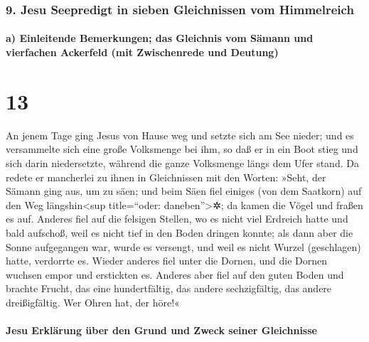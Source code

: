 \hypertarget{jesu-seepredigt-in-sieben-gleichnissen-vom-himmelreich}{%
\subsubsection{9. Jesu Seepredigt in sieben Gleichnissen vom
Himmelreich}\label{jesu-seepredigt-in-sieben-gleichnissen-vom-himmelreich}}

\hypertarget{a-einleitende-bemerkungen-das-gleichnis-vom-suxe4mann-und-vierfachen-ackerfeld-mit-zwischenrede-und-deutung}{%
\paragraph{a) Einleitende Bemerkungen; das Gleichnis vom Sämann und
vierfachen Ackerfeld (mit Zwischenrede und
Deutung)}\label{a-einleitende-bemerkungen-das-gleichnis-vom-suxe4mann-und-vierfachen-ackerfeld-mit-zwischenrede-und-deutung}}

\hypertarget{section-12}{%
\section{13}\label{section-12}}

 An jenem Tage ging Jesus von Hause weg und setzte sich am
See nieder;  und es versammelte sich eine große Volksmenge
bei ihm, so daß er in ein Boot stieg und sich darin niedersetzte,
während die ganze Volksmenge längs dem Ufer stand.  Da
redete er mancherlei zu ihnen in Gleichnissen mit den Worten: »Seht, der
Sämann ging aus, um zu säen;  und beim Säen fiel einiges
(von dem Saatkorn) auf den Weg längshin\textless sup title=``oder:
daneben''\textgreater✲; da kamen die Vögel und fraßen es auf.
 Anderes fiel auf die felsigen Stellen, wo es nicht viel
Erdreich hatte und bald aufschoß, weil es nicht tief in den Boden
dringen konnte;  als dann aber die Sonne aufgegangen war,
wurde es versengt, und weil es nicht Wurzel (geschlagen) hatte,
verdorrte es.  Wieder anderes fiel unter die Dornen, und
die Dornen wuchsen empor und erstickten es.  Anderes aber
fiel auf den guten Boden und brachte Frucht, das eine hundertfältig, das
andere sechzigfältig, das andere dreißigfältig.  Wer Ohren
hat, der höre!«

\hypertarget{jesu-erkluxe4rung-uxfcber-den-grund-und-zweck-seiner-gleichnisse}{%
\paragraph{Jesu Erklärung über den Grund und Zweck seiner
Gleichnisse}\label{jesu-erkluxe4rung-uxfcber-den-grund-und-zweck-seiner-gleichnisse}}

